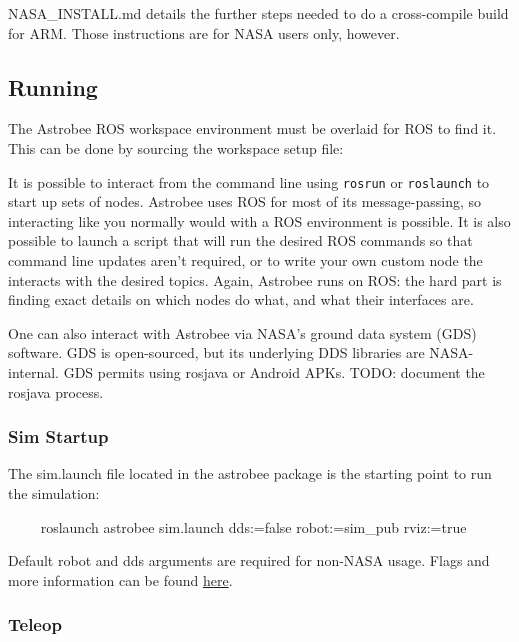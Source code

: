 \documentclass{article}
\begin{document}
NASA\_INSTALL.md details the further steps needed to do a cross-compile build for ARM. Those instructions are for NASA users only, however.

\subsection{Running}
The Astrobee ROS workspace environment must be overlaid for ROS to find it. This can be done by sourcing the workspace setup file:

It is possible to interact from the command line using \texttt{rosrun} or \texttt{roslaunch} to start up sets of nodes. Astrobee uses ROS for most of its message-passing, so interacting like you normally would with a ROS environment is possible. It is also possible to launch a script that will run the desired ROS commands so that command line updates aren't required, or to write your own custom node the interacts with the desired topics. Again, Astrobee runs on ROS: the hard part is finding exact details on which nodes do what, and what their interfaces are.

One can also interact with Astrobee via NASA's ground data system (GDS) software. GDS is open-sourced, but its underlying DDS libraries are NASA-internal. GDS permits using rosjava or Android APKs. TODO: document the rosjava process.

\subsubsection{Sim Startup}

The sim.launch file located in the astrobee package is the starting point to run the simulation:

\begin{markdown}
~~~~
roslaunch astrobee sim.launch dds:=false robot:=sim_pub rviz:=true
~~~~
\end{markdown}

Default robot and dds arguments are required for non-NASA usage. Flags and more information can be found \href{https://github.com/nasa/astrobee/blob/master/simulation/sim_overview.md}{here}.

\subsubsection{Teleop}
\end{document}
